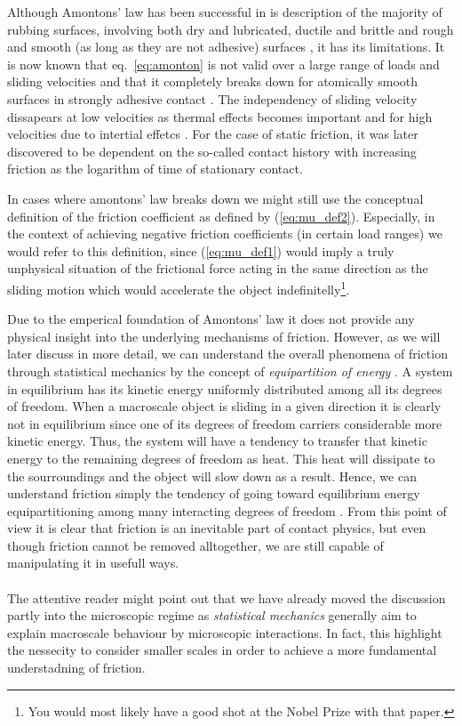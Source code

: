 Although Amontons' law has been successful in is description of the majority of
rubbing surfaces, involving both dry and lubricated, ductile and brittle and
rough and smooth (as long as they are not adhesive) surfaces \cite{gao_frictional_2004},
it has its limitations. It is now known that eq.~\eqref{eq:amonton} is not valid
over a large range of loads and sliding velocities and that it completely breaks
down for atomically smooth surfaces in strongly adhesive contact
\cite{gao_frictional_2004}. The independency of sliding velocity dissapears at
low velocities as thermal effects becomes important and for high velocities due
to intertial effetcs \cite[pp. 5-6]{gnecco_meyer_2015}. For the case of static
friction, it was later discovered to be dependent on the so-called contact
history with increasing friction as the logarithm of time of stationary contact.

In cases where amontons' law breaks down we might still use the conceptual
definition of the friction coefficient as defined by (\ref{eq:mu_def2}).
Especially, in the context of achieving negative friction coefficients (in certain load ranges) we would refer to this definition, since (\ref{eq:mu_def1}) would imply a truly unphysical situation of the frictional force acting in the same direction as the sliding motion which would accelerate the object indefinitelly\footnote{You would most likely have a good shot at the Nobel Prize with that paper.}.

Due to the emperical foundation of Amontons’ law it does not provide
any physical insight into the underlying mechanisms of friction. However, as we
will later discuss in more detail, we can understand the overall phenomena of
friction through statistical mechanics by the concept of \textit{equipartition
of energy} \cite{Manini_2016}. A system in equilibrium has its kinetic energy
uniformly distributed among all its degrees of freedom. When a macroscale object
is sliding in a given direction it is clearly not in equilibrium since one of
its degrees of freedom carriers considerable more kinetic energy. Thus, the
system will have a tendency to transfer that kinetic energy to the remaining
degrees of freedom as heat. This heat will dissipate to the sourroundings and
the object will slow down as a result. Hence, we can understand friction simply the tendency of going toward equilibrium energy equipartitioning among many
interacting degrees of freedom \cite{Manini_2016}. From this point of view it is
clear that friction is an inevitable part of contact physics, but even though
friction cannot be removed alltogether, we are still capable of manipulating it in
usefull ways. \\
\\
The attentive reader might point out that we have already moved the discussion
partly into the microscopic regime as \textit{statistical mechanics} generally
aim to explain macroscale behaviour by microscopic interactions. In fact, this 
highlight the nessecity to consider smaller scales in order to achieve a more fundamental understadning of friction.


